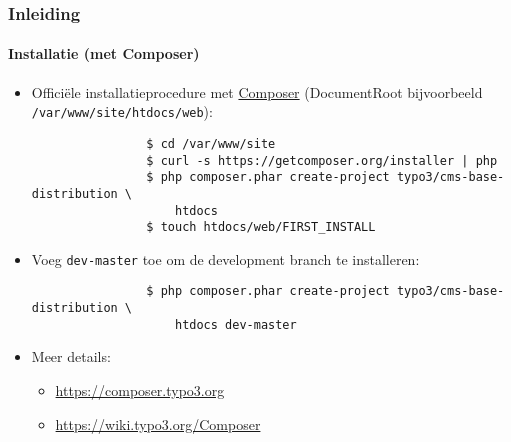 \begin{frame}[fragile]
	\frametitle{Inleiding}
	\framesubtitle{Installatie (met Composer)}

	\begin{itemize}

		\item Officiële installatieprocedure met \href{https://getcomposer.org/}{Composer}\newline
			(DocumentRoot bijvoorbeeld \texttt{/var/www/site/htdocs/web}):

			\begin{lstlisting}
				$ cd /var/www/site
				$ curl -s https://getcomposer.org/installer | php
				$ php composer.phar create-project typo3/cms-base-distribution \
				    htdocs
				$ touch htdocs/web/FIRST_INSTALL
			\end{lstlisting}

		\item Voeg \texttt{dev-master} toe om de development branch te installeren:

			\begin{lstlisting}
				$ php composer.phar create-project typo3/cms-base-distribution \
				    htdocs dev-master
			\end{lstlisting}

		\item Meer details:

			\begin{itemize}
				\item \url{https://composer.typo3.org}
				\item \url{https://wiki.typo3.org/Composer}
			\end{itemize}

	\end{itemize}

\end{frame}

